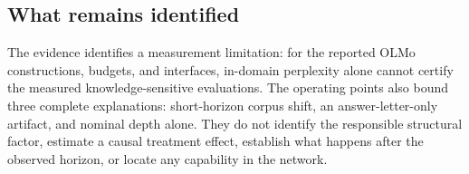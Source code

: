 \subsection{What remains identified}
The evidence identifies a measurement limitation: for the reported OLMo
constructions, budgets, and interfaces, in-domain perplexity alone cannot
certify the measured knowledge-sensitive evaluations. The operating points
also bound three complete explanations: short-horizon corpus shift, an
answer-letter-only artifact, and nominal depth alone. They do not identify the
responsible structural factor, estimate a causal treatment effect, establish
what happens after the observed horizon, or locate any capability in the
network.
